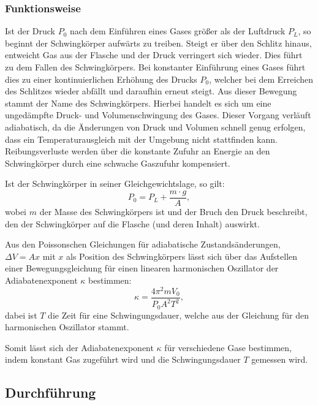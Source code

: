 		\subsubsection{Funktionsweise}
			
			Ist der Druck $P_0$ nach dem Einführen eines Gases größer als der Luftdruck $P_L$, so beginnt der Schwingkörper aufwärts zu treiben.
			Steigt er über den Schlitz hinaus, entweicht Gas aus der Flasche und der Druck verringert sich wieder.
			Dies führt zu dem Fallen des Schwingkörpers.
			Bei konstanter Einführung eines Gases führt dies zu einer kontinuierlichen Erhöhung des Drucks $P_0$, welcher bei dem Erreichen des Schlitzes wieder abfällt und daraufhin erneut steigt.
			Aus dieser Bewegung stammt der Name des Schwingkörpers.
			Hierbei handelt es sich um eine ungedämpfte Druck- und Volumenschwingung des Gases.
			Dieser Vorgang verläuft adiabatisch, da die Änderungen von Druck und Volumen schnell genug erfolgen, dass ein Temperaturausgleich mit der Umgebung nicht stattfinden kann.
			Reibungsverluste werden über die konstante Zufuhr an Energie an den Schwingkörper durch eine schwache Gaszufuhr kompensiert.
			 
			Ist der Schwingkörper in seiner Gleichgewichtslage, so gilt:
			\begin{equation}
				P_0 = P_L + \frac{m\cdot g}{A},
			\end{equation} 
			wobei $m$ der Masse des Schwingkörpers ist und der Bruch den Druck beschreibt, den der Schwingkörper auf die Flasche (und deren Inhalt) auswirkt.
			
			Aus den Poissonschen Gleichungen für adiabatische Zustandsänderungen, $\Delta V = Ax$ mit $x$ als Position des Schwingkörpers lässt sich über das Aufstellen einer Bewegungsgleichung für einen linearen harmonischen Oszillator der Adiabatenexponent $\kappa$ bestimmen:
			\begin{equation} \label{eq:kappav1}
				\kappa = \frac{4\pi^2mV_0}{P_0A^2T^2},
			\end{equation}
			dabei ist $T$ die Zeit für eine Schwingungsdauer, welche aus der Gleichung für den harmonischen Oszillator stammt.
			
			Somit lässt sich der Adiabatenexponent $\kappa$ für verschiedene Gase bestimmen, indem konstant Gas zugeführt wird und die Schwingungsdauer $T$ gemessen wird. 
			
	\subsection{Durchführung}
		
